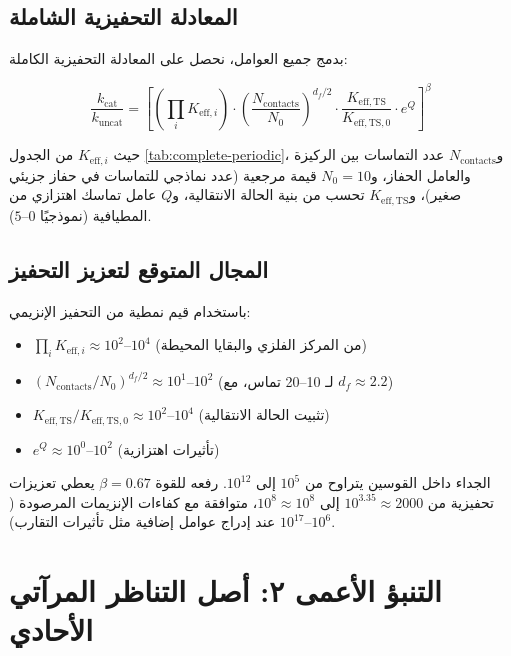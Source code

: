 \documentclass[12pt,a4paper]{article}
\theoremstyle{remark}
\newcommand{\df}{d_{\!f}}
\begin{document}
	\subsection{المعادلة التحفيزية الشاملة}
	
	بدمج جميع العوامل، نحصل على المعادلة التحفيزية الكاملة:
	
	\begin{equation}
		\boxed{\frac{k_{\text{cat}}}{k_{\text{uncat}}} = \left[ \left(\prod_i K_{\mathrm{eff},i}\right) \cdot \left(\frac{N_{\text{contacts}}}{N_0}\right)^{\df/2} \cdot \frac{K_{\mathrm{eff},\text{TS}}}{K_{\mathrm{eff},\text{TS},0}} \cdot e^{Q} \right]^{\beta}}
		\label{eq:cat-universal}
	\end{equation}
	
	حيث $K_{\mathrm{eff},i}$ من الجدول \ref{tab:complete-periodic}، و$N_{\text{contacts}}$ عدد التماسات بين الركيزة والعامل الحفاز، و$N_0 = 10$ قيمة مرجعية (عدد نماذجي للتماسات في حفاز جزيئي صغير)، و$K_{\mathrm{eff},\text{TS}}$ تحسب من بنية الحالة الانتقالية، و$Q$ عامل تماسك اهتزازي من المطيافية (نموذجيًا $0$–$5$).
	
	\subsection{المجال المتوقع لتعزيز التحفيز}
	
	باستخدام قيم نمطية من التحفيز الإنزيمي:
	\begin{itemize}
		\item $\prod_i K_{\mathrm{eff},i} \approx 10^2$–$10^4$ (من المركز الفلزي والبقايا المحيطة)
		\item $(N_{\text{contacts}}/N_0)^{\df/2} \approx 10^1$–$10^2$ (لـ 10–20 تماس، مع $\df \approx 2.2$)
		\item $K_{\mathrm{eff},\text{TS}}/K_{\mathrm{eff},\text{TS},0} \approx 10^2$–$10^4$ (تثبيت الحالة الانتقالية)
		\item $e^{Q} \approx 10^0$–$10^2$ (تأثيرات اهتزازية)
	\end{itemize}
	
	الجداء داخل القوسين يتراوح من $10^5$ إلى $10^{12}$. رفعه للقوة $\beta = 0.67$ يعطي تعزيزات تحفيزية من $10^{3.35} \approx 2000$ إلى $10^{8} \approx 10^8$، متوافقة مع كفاءات الإنزيمات المرصودة ($10^6$–$10^{17}$ عند إدراج عوامل إضافية مثل تأثيرات التقارب).
	
	\section{التنبؤ الأعمى ٢: أصل التناظر المرآتي الأحادي}
	\label{sec:chirality}
	
\end{document}
